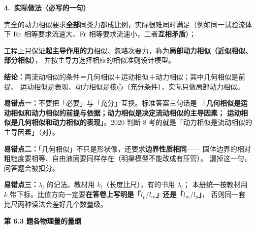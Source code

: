 \begin{jie}
\textbf{4.\ 实际做法（必写的一句）}
\begin{xiaowen}
\item 完全的动力相似要求\textbf{全部}同类力都成比例，实际很难同时满足（例如同一试验流体下
$\mathrm{Re}$ 相等要求流速大、$\mathrm{Fr}$ 相等要求流速小，二者\textbf{互相矛盾}）；
\item 工程上只保证\textbf{起主导作用的力}相似、忽略次要力，称为\textbf{局部动力相似（近似相似、部分相似）}，
并按主导力选择相应的相似准则设计模型。
\end{xiaowen}

\textbf{结论：}两流动相似的条件＝几何相似＋运动相似＋动力相似；其中几何相似是前提、
运动相似是表现、动力相似是核心（充分条件），实际只做局部动力相似。
\end{jie}

\begin{yicuo}
\textbf{易错点一：}不要把「必要」与「充分」互换。标准答案三句话是
「\textbf{几何相似是运动相似和动力相似的前提与依据；动力相似是决定流动相似的主导因素；
运动相似是几何相似和动力相似的表现}」。2020 判断 8 考的就是「动力相似是流动相似的主导因素」（对）。

\textbf{易错点二：}「几何相似」不只是形状像，还要求\textbf{边界性质相同}——
固体边界的相对粗糙度要相等、自由液面要同样存在（明渠模型不能改成有压管）。
漏掉这一句，问答题会被扣分。

\textbf{易错点三：}$\lambda_l$ 的记法。教材用 $k_l$（长度比尺），有的书用 $\lambda_l$；
本册统一按教材用 $k$ 带下标。比值方向一定要\textbf{在答卷上写明是「$l_p/l_m$」还是「$l_m/l_p$」}，
否则同一套比尺两种读法会差好几个数量级。
\end{yicuo}

\noindent\textbf{第 6.3 题\quad 各物理量的量纲}

